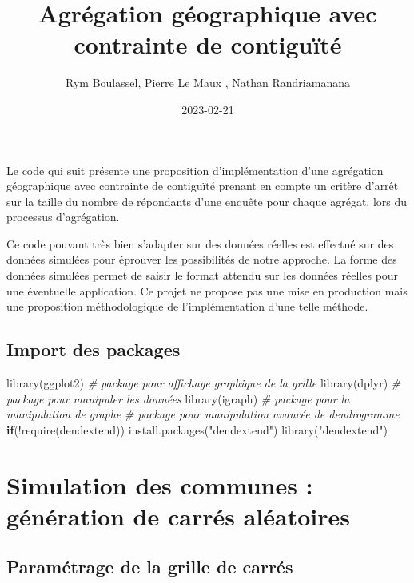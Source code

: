 \documentclass[
]{article}
\title{Agrégation géographique avec contrainte de contiguïté}
\author{Rym Boulassel, Pierre Le Maux , Nathan Randriamanana}
\date{2023-02-21}
\newenvironment{Shaded}{\begin{snugshade}}{\end{snugshade}}
\newcommand{\CommentTok}[1]{\textcolor[rgb]{0.56,0.35,0.01}{\textit{#1}}}
\newcommand{\ControlFlowTok}[1]{\textcolor[rgb]{0.13,0.29,0.53}{\textbf{#1}}}
\newcommand{\FunctionTok}[1]{\textcolor[rgb]{0.00,0.00,0.00}{#1}}
\newcommand{\NormalTok}[1]{#1}
\newcommand{\SpecialCharTok}[1]{\textcolor[rgb]{0.00,0.00,0.00}{#1}}
\newcommand{\StringTok}[1]{\textcolor[rgb]{0.31,0.60,0.02}{#1}}
\begin{document}
\maketitle

Le code qui suit présente une proposition d'implémentation d'une
agrégation géographique avec contrainte de contiguïté prenant en compte
un critère d'arrêt sur la taille du nombre de répondants d'une enquête
pour chaque agrégat, lors du processus d'agrégation.

Ce code pouvant très bien s'adapter sur des données réelles est effectué
sur des données simulées pour éprouver les possibilités de notre
approche. La forme des données simulées permet de saisir le format
attendu sur les données réelles pour une éventuelle application. Ce
projet ne propose pas une mise en production mais une proposition
méthodologique de l'implémentation d'une telle méthode.

\hypertarget{import-des-packages}{%
\subsection{Import des packages}\label{import-des-packages}}

\begin{Shaded}
\begin{Highlighting}[]
\FunctionTok{library}\NormalTok{(ggplot2) }\CommentTok{\# package pour affichage graphique de la grille}
\FunctionTok{library}\NormalTok{(dplyr) }\CommentTok{\# package pour manipuler les données}
\FunctionTok{library}\NormalTok{(igraph) }\CommentTok{\# package pour la manipulation de graphe}
\CommentTok{\# package pour manipulation avancée de dendrogramme}
\ControlFlowTok{if}\NormalTok{(}\SpecialCharTok{!}\FunctionTok{require}\NormalTok{(dendextend)) }\FunctionTok{install.packages}\NormalTok{(}\StringTok{"dendextend"}\NormalTok{)}
\FunctionTok{library}\NormalTok{(}\StringTok{"dendextend"}\NormalTok{)}
\end{Highlighting}
\end{Shaded}

\hypertarget{simulation-des-communes-guxe9nuxe9ration-de-carruxe9s-aluxe9atoires}{%
\section{Simulation des communes : génération de carrés
aléatoires}\label{simulation-des-communes-guxe9nuxe9ration-de-carruxe9s-aluxe9atoires}}

\hypertarget{paramuxe9trage-de-la-grille-de-carruxe9s}{%
\subsection{Paramétrage de la grille de
carrés}\label{paramuxe9trage-de-la-grille-de-carruxe9s}}
\end{document}
